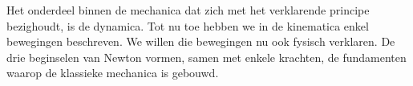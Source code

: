 \documentclass{ximera}
\begin{document}
	\author{Bart Lambregs}
    \xmsource\xmuitleg


	Het onderdeel binnen de mechanica dat zich met het verklarende principe bezighoudt, is de dynamica. Tot nu toe hebben we in de kinematica enkel bewegingen beschreven. We willen die bewegingen nu ook fysisch verklaren. De drie beginselen van Newton vormen, samen met enkele krachten, de fundamenten waarop de klassieke mechanica is gebouwd. 

	
\end{document}
